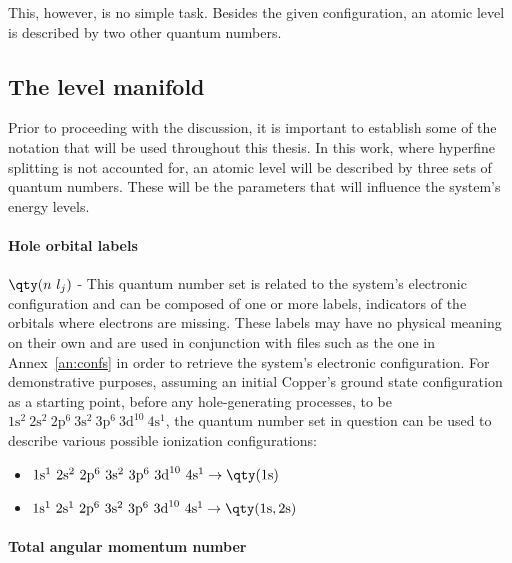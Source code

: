 This, however, is no simple task. Besides the given configuration, an atomic level is described by two other quantum numbers.

\subsection{The level manifold}




Prior to proceeding with the discussion, it is important to establish some of the notation that will be used throughout this thesis. In this work, where hyperfine splitting is not accounted for, an atomic level will be described by three sets of quantum numbers. These will be the parameters that will influence the system's energy levels.

\paragraph{Hole orbital labels}


$\qty(n\ l_j)$ - This quantum number set is related to the system's electronic configuration and can be composed of one or more labels, indicators of the orbitals where electrons are missing. These labels may have no physical meaning on their own and are used in conjunction with files such as the one in Annex~\ref{an:confs} in order to retrieve the system's electronic configuration.
For demonstrative purposes, assuming an initial Copper's ground state configuration as a starting point, before any hole-generating processes, to be $1\text{s}^2\ 2\text{s}^2\ 2\text{p}^6\ 3\text{s}^2\ 3\text{p}^6\ 3\text{d}^{10}\ 4\text{s}^1$, the quantum number set in question can be used to describe various possible ionization configurations:

\begin{itemize}
    \item $1\text{s}^1\ 2\text{s}^2\ 2\text{p}^6\ 3\text{s}^2\ 3\text{p}^6\ 3\text{d}^{10}\ 4\text{s}^1  \rightarrow \qty(1\text{s})$
    \item $1\text{s}^1\ 2\text{s}^1\ 2\text{p}^6\ 3\text{s}^2\ 3\text{p}^6\ 3\text{d}^{10}\ 4\text{s}^1 \rightarrow \qty(1\text{s},2\text{s})$
\end{itemize}




\paragraph{Total angular momentum number}



